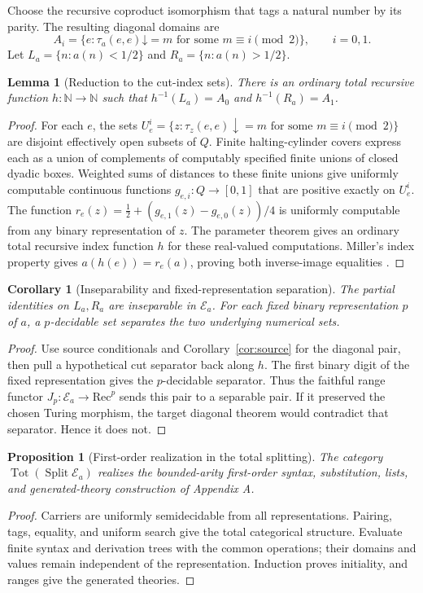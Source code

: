 \documentclass[11pt]{article}
\newtheorem{lemma}[theorem]{Lemma}
\newtheorem{proposition}[theorem]{Proposition}
\newtheorem{corollary}[theorem]{Corollary}
\theoremstyle{definition}\newtheorem{definition}[theorem]{Definition}
\newcommand{\N}{\mathbb N}
\newcommand{\Tot}{\operatorname{Tot}}
\newcommand{\Split}{\operatorname{Split}}
\newcommand{\E}{\mathcal E}
\begin{document}
Choose the recursive coproduct isomorphism that tags a natural
number by its parity. The resulting diagonal domains are
\[
 A_i=\{e:\tau_a(e,e)\mathord\downarrow=m
                 \text{ for some }m\equiv i\pmod 2\},
 \qquad i=0,1.
\]
Let
$L_a=\{n:a(n)<1/2\}$ and $R_a=\{n:a(n)>1/2\}$.

\begin{lemma}[Reduction to the cut-index sets]\label{lem:miller-cuts}
There is an ordinary total recursive function $h:\N\to\N$ such
that $h^{-1}(L_a)=A_0$ and $h^{-1}(R_a)=A_1$.
\end{lemma}
\begin{proof}
For each $e$, the sets
$U_e^i=\{z:\tau_z(e,e)\downarrow=m\text{ for some }m\equiv i\pmod2\}$
are disjoint effectively open subsets of $Q$. Finite halting-cylinder
covers express each as a union of complements of computably
specified finite unions of closed dyadic boxes. Weighted sums of
distances to these finite unions give uniformly computable continuous functions
$g_{e,i}:Q\to[0,1]$ that are positive exactly on $U_e^i$.
The function
$r_e(z)=\tfrac12+(g_{e,1}(z)-g_{e,0}(z))/4$
is uniformly computable from any binary representation of $z$.
The parameter theorem gives an ordinary total recursive index
function $h$ for these real-valued computations. Miller's index
property gives $a(h(e))=r_e(a)$, proving both inverse-image
equalities \cite{Miller}.
\end{proof}

\begin{corollary}[Inseparability and fixed-representation separation]\label{cor:miller-cuts}
The partial identities on $L_a,R_a$ are inseparable in $\E_a$.
For each fixed binary representation $p$ of $a$, a $p$-decidable
set separates the two underlying numerical sets.
\end{corollary}
\begin{proof}
Use source conditionals and Corollary~\ref{cor:source} for the
diagonal pair, then pull a hypothetical cut separator back along
$h$. The first binary digit of the fixed representation gives the
$p$-decidable separator. Thus the faithful range functor
$J_p:\E_a\to\mathrm{Rec}^{p}$ sends this pair to a separable
pair. If it preserved the chosen Turing morphism, the target
diagonal theorem would contradict that separator. Hence it does not.
\end{proof}

\begin{proposition}[First-order realization in the total splitting]\label{prop:miller-realization}
The category $\Tot(\Split\E_a)$ realizes the bounded-arity
first-order syntax, substitution, lists, and generated-theory
construction of Appendix A.
\end{proposition}
\begin{proof}
Carriers are uniformly semidecidable
from all representations. Pairing, tags, equality, and uniform
search give the total categorical structure. Evaluate finite syntax
and derivation trees with the common operations; their domains and
values remain independent of the representation. Induction proves
initiality, and ranges give the generated theories.
\end{proof}
\end{document}
